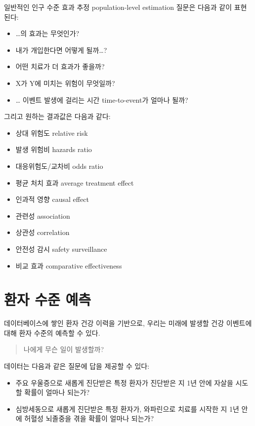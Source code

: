 \documentclass[10.5pt]{book}
\providecommand{\tightlist}{%
  \setlength{\itemsep}{0pt}\setlength{\parskip}{0pt}}
\theoremstyle{definition}
\theoremstyle{definition}
\theoremstyle{definition}
\theoremstyle{remark}
\begin{document}
일반적인 인구 수준 효과 추정 population-level estimation 질문은 다음과
같이 표현된다:

\begin{itemize}
\tightlist
\item
  \ldots{}의 효과는 무엇인가?
\item
  내가 개입한다면 어떻게 될까\ldots{}?
\item
  어떤 치료가 더 효과가 좋을까?
\item
  X가 Y에 미치는 위험이 무엇일까?
\item
  \ldots{} 이벤트 발생에 걸리는 시간 time-to-event가 얼마나 될까?
\end{itemize}

그리고 원하는 결과값은 다음과 같다:

\begin{itemize}
\tightlist
\item
  상대 위험도 relative risk
\item
  발생 위험비 hazards ratio
\item
  대응위험도/교차비 odds ratio
\item
  평균 처치 효과 average treatment effect
\item
  인과적 영향 causal effect
\item
  관련성 association
\item
  상관성 correlation
\item
  안전성 감시 safety surveillance
\item
  비교 효과 comparative effectiveness
\end{itemize}

\section{환자 수준 예측}\label{--}


데이터베이스에 쌓인 환자 건강 이력을 기반으로, 우리는 미래에 발생할 건강
이벤트에 대해 환자 수준의 예측할 수 있다.

\begin{quote}
나에게 무슨 일이 발생할까?
\end{quote}

데이터는 다음과 같은 질문에 답을 제공할 수 있다:

\begin{itemize}
\tightlist
\item
  주요 우울증으로 새롭게 진단받은 특정 환자가 진단받은 지 1년 안에
  자살을 시도할 확률이 얼마나 되는가?
\item
  심방세동으로 새롭게 진단받은 특정 환자가, 와파린으로 치료를 시작한 지
  1년 안에 허혈성 뇌졸중을 겪을 확률이 얼마나 되는가?
\end{itemize}
\end{document}
